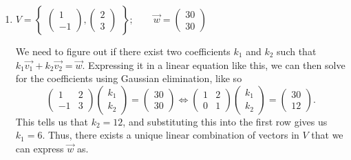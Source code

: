 \documentclass{article}
\begin{document}
\begin{enumerate}
    \item \(V = \begin{Bmatrix}
        \begin{pmatrix}
            1\\-1
        \end{pmatrix},\begin{pmatrix}
            2\\3
        \end{pmatrix}
    \end{Bmatrix}; \qquad \overrightarrow{w} = \begin{pmatrix}
        30\\30
    \end{pmatrix}\)\begin{solution}
        We need to figure out if there exist two coefficients \(k_1\) and \(k_2\) such that \(k_1\overrightarrow{v_1} + k_2\overrightarrow{v_2} = \overrightarrow{w}\).
        Expressing it in a linear equation like this, we can then solve for the coefficients using Gaussian elimination, like so\[
            \begin{pmatrix}
                1&2 \\ -1&3
            \end{pmatrix}\begin{pmatrix}
                k_1\\k_2
            \end{pmatrix} = \begin{pmatrix}
                30\\30
            \end{pmatrix} \Longleftrightarrow \begin{pmatrix}
                1&2 \\ 0&1
            \end{pmatrix}\begin{pmatrix}
                k_1\\k_2
            \end{pmatrix} = \begin{pmatrix}
                30\\12
            \end{pmatrix}.
        \] This tells us that \(k_2 =12\), and substituting this into the first row gives us \(k_1=6\). Thus, there exists a unique linear combination of vectors in \(V\) that we can express \(\overrightarrow{w}\) as. 
    \end{solution}
    \begin{minipage}{.14\textwidth}

\end{minipage}
\end{enumerate}
\end{document}
